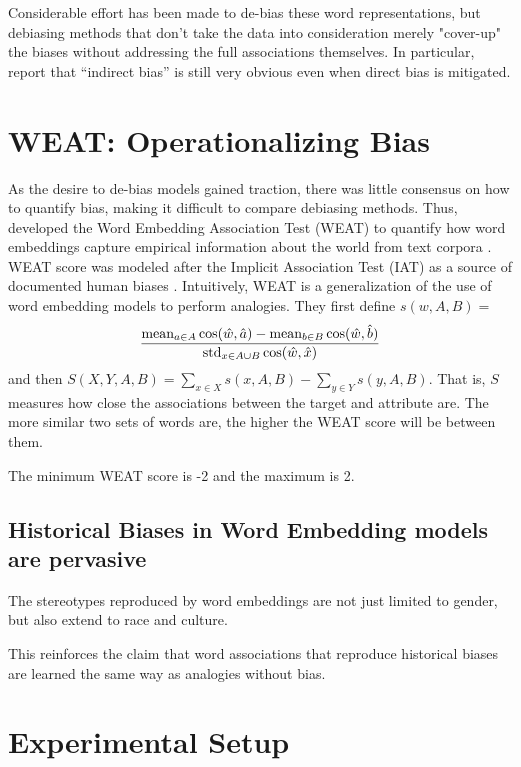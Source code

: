 \documentclass[11pt,a4paper]{article}
\begin{document}
Considerable effort has been made to de-bias these word representations, but debiasing methods that don't take the data into consideration merely "cover-up" the biases without addressing the full associations themselves. In particular, \citet{lipstick-1903-03862} report that ``indirect bias'' is still very obvious even when direct bias is mitigated.


\section{WEAT: Operationalizing Bias}

As the desire to de-bias models gained traction, there was little consensus on how to quantify bias, making it difficult to compare debiasing methods. Thus, \citet{weat-1608-07187} developed the Word Embedding Association Test (WEAT) to quantify how word embeddings capture empirical information about the world from text corpora \citep[8]{weat-1608-07187}. WEAT score was modeled after the Implicit Association Test (IAT) as a source of documented human biases \citep[2]{weat-1608-07187}. Intuitively, WEAT is a generalization of the use of word embedding models to perform analogies. They first define  $s(w, A,B)= $
$$\\ \frac{ \text{mean}_{a \in A} \cos(\hat{w}, \hat{a} )
                    - \text{mean}_{b \in B} \cos(\hat{w}, \hat{b} ) }
                    {\text{std}_{x\in A \cup B} \cos(\hat{w}, \hat{x})}$$  and then $S(X,Y,A,B) = \sum_{x\in X} s(x, A, B) -  \sum_{y\in Y} s(y, A, B)$. That is, $S$ measures how close the associations between the target and attribute are. The more similar two sets of words are, the higher the WEAT score will be between them.

The minimum WEAT score is -2 and the maximum is 2.

\subsection{Historical Biases in Word Embedding models are pervasive}

The stereotypes reproduced by word embeddings are not just limited to gender, but also extend to race and culture.

This reinforces the claim that word associations that reproduce historical biases are learned the same way as analogies without bias.

\section{Experimental Setup}
\end{document}
